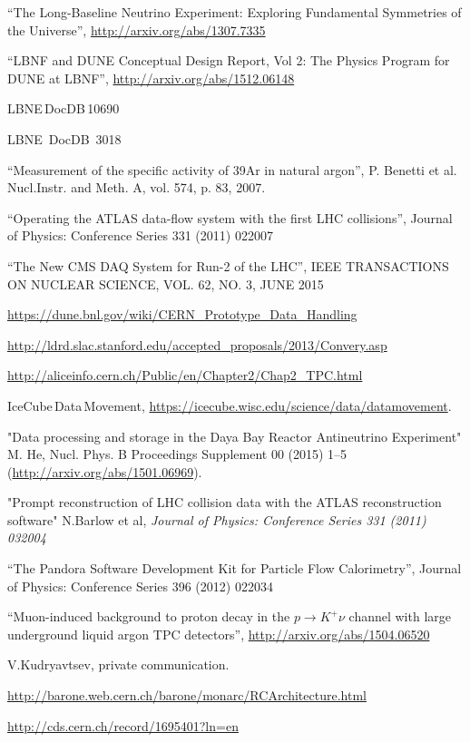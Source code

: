 \begin{thebibliography}{99}

 ``The Long-Baseline Neutrino Experiment: Exploring Fundamental Symmetries of the Universe'',  \url{http://arxiv.org/abs/1307.7335}

 ``LBNF and DUNE Conceptual Design Report, Vol 2: The Physics Program for DUNE at LBNF'', \url{http://arxiv.org/abs/1512.06148}

 LBNE\,DocDB\,10690  %

 LBNE~DocDB~3018%

 ``Measurement of the specific activity of 39Ar in natural argon'', P. Benetti et al. Nucl.Instr. and Meth. A, vol. 574, p. 83, 2007.

 ``Operating the ATLAS data-flow system with the first LHC collisions'', Journal of Physics: Conference Series 331 (2011) 022007

 ``The New CMS DAQ System for Run-2 of the LHC'', IEEE TRANSACTIONS ON NUCLEAR SCIENCE, VOL. 62, NO. 3, JUNE 2015

 \url{https://dune.bnl.gov/wiki/CERN_Prototype_Data_Handling}

 \url{http://ldrd.slac.stanford.edu/accepted_proposals/2013/Convery.asp}

 \url{http://aliceinfo.cern.ch/Public/en/Chapter2/Chap2_TPC.html}

 IceCube\,Data\,Movement, \url{https://icecube.wisc.edu/science/data/datamovement}.

"Data processing and storage in the Daya Bay Reactor Antineutrino Experiment" M. He, Nucl. Phys. B Proceedings Supplement 00 (2015) 1–5 (\url{http://arxiv.org/abs/1501.06969}).

 "Prompt reconstruction of LHC collision data with the ATLAS reconstruction software" N.Barlow et al, \textit{Journal of Physics: Conference Series 331 (2011) 032004}

 ``The Pandora Software Development Kit for Particle Flow Calorimetry'', Journal of Physics: Conference Series 396 (2012) 022034

 ``Muon-induced background to proton decay in the $p \rightarrow K^+\nu$ channel with large underground liquid argon TPC detectors'', \url{http://arxiv.org/abs/1504.06520}

 V.Kudryavtsev, private communication.

 \url{http://barone.web.cern.ch/barone/monarc/RCArchitecture.html}

 \url{http://cds.cern.ch/record/1695401?ln=en}

\end{thebibliography}